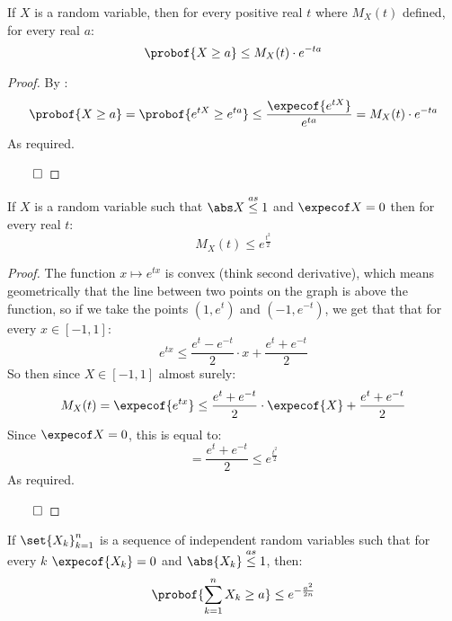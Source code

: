 \begin{thrm*}

	If $X$ is a random variable, then for every positive real $t$ where $M_X(t)$ defined, for every real $a$:
	\[ \probof{X\geq a}\leq M_X(t)\cdot e^{-ta} \]

\end{thrm*}

\begin{proof}

	By :
	\[ \probof{X\geq a} = \probof{e^{tX}\geq e^{ta}} \leq \frac{\expecof{e^{tX}}}{e^{ta}} = M_X(t)\cdot e^{-ta} \]
	As required.

	\hfill$\qed$

\end{proof}

\begin{lemm*}

	If $X$ is a random variable such that $\abs X\asleq1$ and $\expecof X=0$ then for every real $t$:
	\[ M_X(t)\leq e^{\frac{t^2}2} \]

\end{lemm*}

\begin{proof}

	The function $x\mapsto e^{tx}$ is convex (think second derivative), which means geometrically that the line between
	two points on the graph is above the function, so if we take the points $(1,e^t)$ and $(-1,e^{-t})$, we get that that for every
	$x\in[-1,1]$:
	\[ e^{tx}\leq \frac{e^t-e^{-t}}2\cdot x + \frac{e^t+e^{-t}}2 \]
	So then since $X\in[-1,1]$ almost surely:
	\[ M_X(t) = \expecof{e^{tx}} \leq \frac{e^t+e^{-t}}2\cdot\expecof{X} + \frac{e^t+e^{-t}}2 \]
	Since $\expecof X=0$, this is equal to:
	\[ = \frac{e^t+e^{-t}}2 \leq e^{\frac{t^2}2} \]
	As required.

	\hfill$\qed$

\end{proof}

\begin{thrm*}

	If $\set{X_k}_{k=1}^n$ is a sequence of independent random variables such that for every $k$ $\expecof{X_k}=0$ and
	$\abs{X_k}\asleq1$, then:
	\[ \probof{\sum_{k=1}^n X_k\geq a}\leq e^{-\frac{a^2}{2n}} \]

\end{thrm*}

